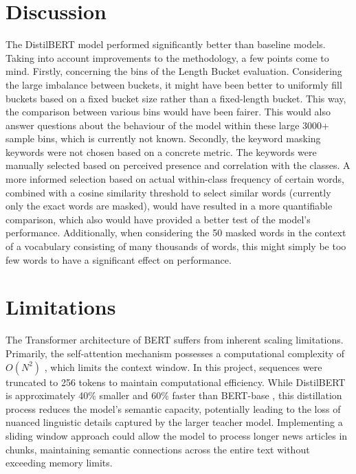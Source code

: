 \documentclass[12pt,a4paper,english]{article}
\begin{document}
\section{Discussion}
The DistilBERT model performed significantly better than baseline models. Taking into account improvements to the methodology, a few points come to mind. Firstly, concerning the bins of the Length Bucket evaluation. Considering the large imbalance between buckets, it might have been better to uniformly fill buckets based on a fixed bucket size rather than a fixed-length bucket. This way, the comparison between various bins would have been fairer. This would also answer questions about the behaviour of the model within these large 3000+ sample bins, which is currently not known. Secondly, the keyword masking keywords were not chosen based on a concrete metric. The keywords were manually selected based on perceived presence and correlation with the classes. A more informed selection based on actual within-class frequency of certain words, combined with a cosine similarity threshold to select similar words (currently only the exact words are masked), would have resulted in a more quantifiable comparison, which also would have provided a better test of the model's performance. Additionally, when considering the 50 masked words in the context of a vocabulary consisting of many thousands of words, this might simply be too few words to have a significant effect on performance. 


\section{Limitations}

The Transformer architecture of BERT suffers from inherent scaling limitations. Primarily, the self-attention mechanism possesses a computational complexity of $O(N^2)$ \cite{vaswani2023attentionneed}, which limits the context window. In this project, sequences were truncated to 256 tokens to maintain computational efficiency. While DistilBERT is approximately 40\% smaller and 60\% faster than BERT-base \cite{sanh2020distilbertdistilledversionbert}, this distillation process reduces the model's semantic capacity, potentially leading to the loss of nuanced linguistic details captured by the larger teacher model. Implementing a sliding window approach could allow the model to process longer news articles in chunks, maintaining semantic connections across the entire text without exceeding memory limits.
\end{document}

